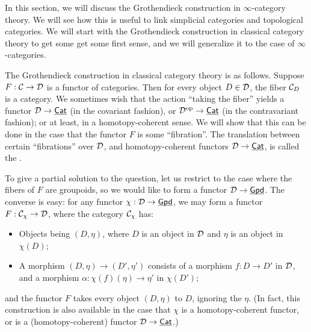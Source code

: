 In this section, we will discuss the Grothendieck construction in $\infty$-category theory.
We will see how this is useful to link simplicial categories and topological categories.
We will start with the Grothendieck construction in classical category theory to get some get some first sense,
and we will generalize it to the case of $\infty$-categories.

The Grothendieck construction in classical category theory is as follows. Suppose $F:\mathcal{C}\to\mathcal{D}$ is a functor of categories.
Then for every object $D\in\mathcal{D}$, the fiber $\mathcal{C}_{D}$ is a category. We sometimes wish that the action ``taking the fiber''
yields a functor $\mathcal{D}\to\underline{\smash{\mathsf{Cat}}}$ (in the covariant fashion), or $\mathcal{D}^{\mathrm{op}}\to\underline{\smash{\mathsf{Cat}}}$ (in the contravariant fashion);
or at least, in a homotopy-coherent sense. We will show that this can be done in the case that the functor $F$ is some ``fibration''.
The translation between certain ``fibrations'' over $\mathcal{D}$, and homotopy-coherent functors $\mathcal{D}\to\underline{\smash{\mathsf{Cat}}}$,
is called the .


To give a partial solution to the question, let us restrict to the case where the fibers of $F$ are groupoids, so we would
like to form a functor $\mathcal{D}\to\underline{\smash{\mathsf{Gpd}}}$. The converse is easy: for any functor $\chi:\mathcal{D}\to\underline{\smash{\mathsf{Gpd}}}$, we may form a functor
$F:\mathcal{C}_\chi\to\mathcal{D}$, where the category $\mathcal{C}_\chi$ has:
\begin{itemize}
    \item Objects being $(D,\eta)$, where $D$ is an object in $\mathcal{D}$ and $\eta$ is an object in $\chi(D)$;
    \item A morphism $(D,\eta)\to(D',\eta')$ consists of a morphism $f:D\to D'$ in $\mathcal{D}$, and a morphism $\alpha:\chi(f)(\eta)\to\eta'$
    in $\chi(D')$;
\end{itemize}
and the functor $F$ takes every object $(D,\eta)$ to $D$, ignoring the $\eta$.
(In fact, this construction is also available in the case that $\chi$ is a homotopy-coherent functor,
or is a (homotopy-coherent) functor $\mathcal{D}\to\underline{\smash{\mathsf{Cat}}}$.) 


